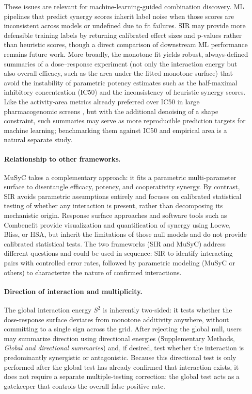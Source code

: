 \documentclass[unnumsec,webpdf,contemporary,large]{oup-authoring-template}
\begin{document}
These issues are relevant for machine-learning-guided combination discovery.
ML pipelines that predict synergy scores \cite{DeepSynergy2018,Kuenzi2020,Menden2019} inherit label noise when those scores are inconsistent across models or undefined due to fit failures.
SIR may provide more defensible training labels by returning calibrated effect sizes and p-values rather than heuristic scores, though a direct comparison of downstream ML performance remains future work.
More broadly, the monotone fit yields robust, always-defined summaries of a dose--response experiment (not only the interaction energy but also overall efficacy, such as the area under the fitted monotone surface) that avoid the instability of parametric potency estimates such as the half-maximal inhibitory concentration (IC50) and the inconsistency of heuristic synergy scores. Like the activity-area metrics already preferred over IC50 in large pharmacogenomic screens \cite{Barretina2012}, but with the additional denoising of a shape constraint, such summaries may serve as more reproducible prediction targets for machine learning; benchmarking them against IC50 and empirical area is a natural separate study.

\paragraph{Relationship to other frameworks.}
MuSyC \cite{MuSyC2021} takes a complementary approach: it fits a parametric multi-parameter surface to disentangle efficacy, potency, and cooperativity synergy.
By contrast, SIR avoids parametric assumptions entirely and focuses on calibrated statistical testing of whether any interaction is present, rather than decomposing its mechanistic origin.
Response surface approaches \cite{Greco1995} and software tools such as Combenefit \cite{DiVeroli2016} provide visualization and quantification of synergy using Loewe, Bliss, or HSA, but inherit the limitations of those null models and do not provide calibrated statistical tests.
The two frameworks (SIR and MuSyC) address different questions and could be used in sequence: SIR to identify interacting pairs with controlled error rates, followed by parametric modeling (MuSyC or others) to characterize the nature of confirmed interactions.

\paragraph{Direction of interaction and multiplicity.}
The global interaction energy $S^2$ is inherently two-sided: it tests whether the dose-response surface deviates from monotone additivity anywhere, without committing to a single sign across the grid.
After rejecting the global null, users may summarize direction using directional energies (Supplementary Methods, \emph{Global and directional summaries}) and, if desired, test whether the interaction is predominantly synergistic or antagonistic.
Because this directional test is only performed after the global test has already confirmed that interaction exists, it does not require a separate multiple-testing correction: the global test acts as a gatekeeper that controls the overall false-positive rate.
\end{document}
